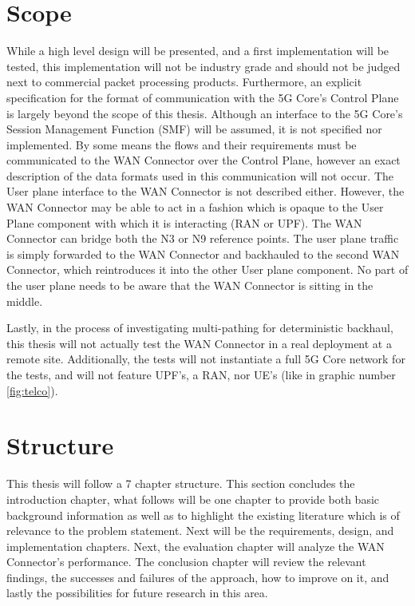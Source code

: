 \section{Scope}
\label{sec:scope}

While a high level design will be presented, and a first implementation will be tested, this implementation will not be industry grade and should not be judged next to commercial packet processing products.  Furthermore, an explicit specification for the format of communication with the 5G Core's Control Plane is largely beyond the scope of this thesis. Although an interface to the 5G Core's Session Management Function (SMF) will be assumed, it is not specified nor implemented. By some means the flows and their requirements must be communicated to the WAN Connector over the Control Plane, however an exact description of the data formats used in this communication will not occur. The User plane interface to the WAN Connector is not described either. However, the WAN Connector may be able to act in a fashion which is opaque to the User Plane component with which it is interacting (RAN or UPF). The WAN Connector can bridge both the N3 or N9 reference points. The user plane traffic is simply forwarded to the WAN Connector and backhauled to the second WAN Connector, which reintroduces it into the other User plane component. No part of the user plane needs to be aware that the WAN Connector is sitting in the middle.

Lastly, in the process of investigating multi-pathing for deterministic backhaul, this thesis will not actually test the WAN Connector in a real deployment at a remote site. Additionally, the tests will not instantiate a full 5G Core network for the tests, and will not feature UPF's, a RAN, nor UE's (like in graphic number \ref{fig:telco}).

\section{Structure}

This thesis will follow a 7 chapter structure. This section concludes the introduction chapter, what follows will be one chapter to provide both basic background information as well as to highlight the existing literature which is of relevance to the problem statement. Next will be the requirements, design, and implementation chapters. Next, the evaluation chapter will analyze the WAN Connector's performance. The conclusion chapter will review the relevant findings, the successes and failures of the approach, how to improve on it, and lastly the possibilities for future research in this area.




